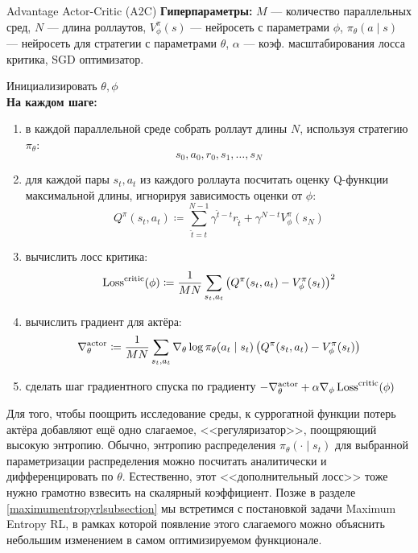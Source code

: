\begin{algorithm}{Advantage Actor-Critic (A2C)}
\textbf{Гиперпараметры:} $M$ --- количество параллельных сред, $N$ --- длина роллаутов, $V^\pi_\phi(s)$ --- нейросеть с параметрами $\phi$, $\pi_\theta(a \mid s)$ --- нейросеть для стратегии с параметрами $\theta$, $\alpha$ --- коэф. масштабирования лосса критика, SGD оптимизатор.

\vspace{0.3cm}
Инициализировать $\theta, \phi$ \\
\textbf{На каждом шаге:}
\begin{enumerate}
    \item в каждой параллельной среде собрать роллаут длины $N$, используя стратегию $\pi_{\theta}$:
    $$s_0, a_0, r_0, s_1, \dots , s_N$$
    \item для каждой пары $s_t, a_t$ из каждого роллаута посчитать оценку Q-функции максимальной длины, игнорируя зависимость оценки от $\phi$:
    $$Q^\pi(s_t, a_t) \coloneqq \sum_{\hat{t} = t}^{N-1} \gamma^{\hat{t} - t} r_{\hat{t}} + \gamma^{N - t} V^\pi_{\phi}(s_N)$$
    \item вычислить лосс критика:
    $$\operatorname{Loss}^{\mathrm{critic}}(\phi) \coloneqq \frac{1}{MN}\sum_{s_t, a_t} \left( Q^\pi(s_t, a_t) - V^\pi_\phi(s_t) \right) ^2$$
    \item вычислить градиент для актёра:
    $$\nabla^{\mathrm{actor}}_\theta \coloneqq \frac{1}{MN}\sum_{s_t, a_t} \nabla_\theta \log \pi_\theta(a_t \mid s_t) \left( Q^\pi(s_t, a_t) - V^\pi_\phi(s_t) \right) $$
    \item сделать шаг градиентного спуска по градиенту $-\nabla^{\mathrm{actor}}_\theta + \alpha \nabla_\phi \operatorname{Loss}^{\mathrm{critic}}(\phi)$
\end{enumerate}
\end{algorithm}

\begin{remark}
Для того, чтобы поощрить исследование среды, к суррогатной функции потерь актёра добавляют ещё одно слагаемое, <<регуляризатор>>, поощряющий высокую энтропию. Обычно, энтропию распределения $\pi_{\theta}(\cdot \mid s_t)$ для выбранной параметризации распределения можно посчитать аналитически и дифференцировать по $\theta$. Естественно, этот <<дополнительный лосс>> тоже нужно грамотно взвесить на скалярный коэффициент. Позже в разделе \ref{maximumentropyrlsubsection} мы встретимся с постановкой задачи Maximum Entropy RL, в рамках которой появление этого слагаемого можно объяснить небольшим изменением в самом оптимизируемом функционале.
\end{remark}

